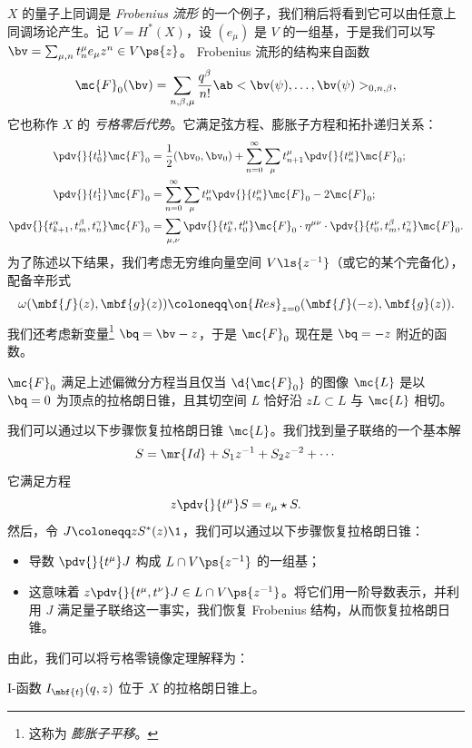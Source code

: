 \(X\) 的量子上同调是 \textit{Frobenius 流形} 的一个例子，我们稍后将看到它可以由任意上同调场论产生。记 \(V = H^*(X)\)，设 \((e_{\mu})\) 是 \(V\) 的一组基，于是我们可以写 $\bv = \sum_{\mu,n} t^{\mu}_n e_{\mu} z^n \in V\ps{z}$。
Frobenius 流形的结构来自函数
\[
    \mc{F}_0(\bv) = \sum_{n, \beta, \mu} \frac{q^{\beta}}{n!} \ab<\bv(\psi), \ldots, \bv(\psi)>_{0,n,\beta},
\]
它也称作 \(X\) 的 \textit{亏格零后代势}。它满足弦方程、膨胀子方程和拓扑递归关系：
\begin{align*}
    \pdv{}{t_0^1} \mc{F}_0 &= \frac{1}{2} (\bv_0, \bv_0) + \sum_{n=0}^{\infty} \sum_{\mu} t_{n+1}^{\mu} \pdv{}{t_n^{\mu}} \mc{F}_0; \\
    \pdv{}{t_1^1} \mc{F}_0 &= \sum_{n=0}^{\infty} \sum_{\mu} t_n^{\mu} \pdv{}{t_n^{\mu}}\mc{F}_0 - 2 \mc{F}_0; \\
    \pdv{}{t_{k+1}^{\alpha},t_m^{\beta},t_n^{\gamma}} \mc{F}_0 &= \sum_{\mu,\nu} \pdv{}{t_k^{\alpha},t_0^{\mu}} \mc{F}_0 \cdot \eta^{\mu\nu} \cdot \pdv{}{t_0^{\nu},t_{m}^{\beta},t_n^{\gamma}} \mc{F}_0.
\end{align*}
为了陈述以下结果，我们考虑无穷维向量空间 $V\ls{z^{-1}}$（或它的某个完备化），配备辛形式
\[ \omega(\mbf{f}(z), \mbf{g}(z)) \coloneqq \on{Res}_{z=0}(\mbf{f}(-z), \mbf{g}(z)). \]
我们还考虑新变量\footnote{这称为 \textit{膨胀子平移}。} $\bq = \bv - z$，于是 $\mc{F}_0$ 现在是 $\bq = -z$ 附近的函数。

\begin{thm}
    $\mc{F}_0$ 满足上述偏微分方程当且仅当 $\d{\mc{F}_0}$ 的图像 $\mc{L}$ 是以 $\bq = 0$ 为顶点的拉格朗日锥，且其切空间 $L$ 恰好沿 $zL \subset L$ 与 $\mc{L}$ 相切。
\end{thm}

我们可以通过以下步骤恢复拉格朗日锥 $\mc{L}$。我们找到量子联络的一个基本解
\[ S = \mr{Id} + S_1 z^{-1} + S_2 z^{-2} + \cdots \]
它满足方程
\[ z \pdv{}{t^{\mu}}S = e_{\mu} \star S. \]
然后，令 $J \coloneqq z S^*(z) \1$，我们可以通过以下步骤恢复拉格朗日锥：
\begin{itemize}
    \item 导数 $\pdv{}{t^{\mu}} J$ 构成 $L \cap V\ps{z^{-1}}$ 的一组基；
    \item 这意味着 $z \pdv{}{t^{\mu},t^{\nu}} J \in L \cap V \ps{z^{-1}}$。将它们用一阶导数表示，并利用 $J$ 满足量子联络这一事实，我们恢复 Frobenius 结构，从而恢复拉格朗日锥。
\end{itemize}

由此，我们可以将亏格零镜像定理解释为：
\begin{thm}
    I-函数 \(I_{\mbf{t}}(q,z)\) 位于 \(X\) 的拉格朗日锥上。
\end{thm}




